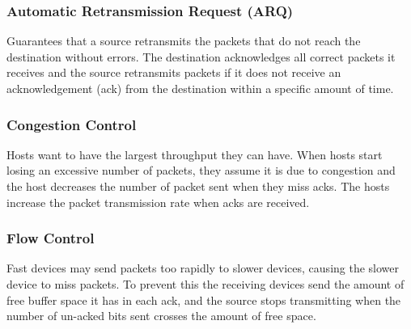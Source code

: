 \subsubsection*{Automatic Retransmission Request (ARQ)}
Guarantees that a source retransmits the packets that do not reach the destination without errors. The destination acknowledges all correct packets it receives and the source retransmits packets if it does not receive an acknowledgement (ack) from the destination within a specific amount of time. 
\subsubsection*{Congestion Control}
Hosts want to have the largest throughput they can have. When hosts start losing an excessive number of packets, they assume it is due to congestion and the host decreases the number of packet sent when they miss acks. The hosts increase the packet transmission rate when acks are received.
\subsubsection*{Flow Control}
Fast devices may send packets too rapidly to slower devices, causing the slower device to miss packets. To prevent this the receiving devices send the amount of free buffer space it has in each ack, and the source stops transmitting when the number of un-acked bits sent crosses the amount of free space. 